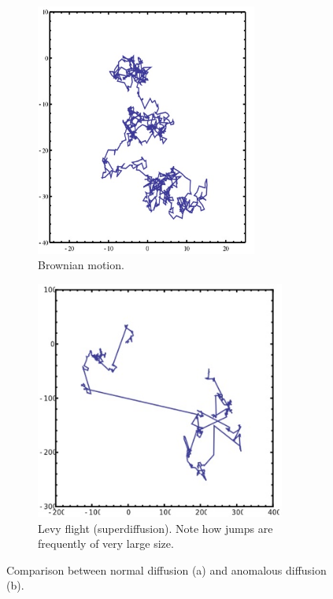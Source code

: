 \documentclass[../template.tex]{subfiles}
\begin{document}
\begin{figure}[!tbp]
    \begin{subfigure}[c]{0.45\textwidth}
      \centering
      \includegraphics[width=0.8\textwidth]{Images/brownian.jpg}
      \caption{Brownian motion.}
      \label{fig:f1}
    \end{subfigure}
    \hfill
    \begin{subfigure}[c]{0.45\textwidth}
      \centering
      \includegraphics[width=0.9\textwidth]{Images/levy.jpg}
      \caption{Levy flight (superdiffusion). Note how jumps are frequently of very large size.}
      \label{fig:f2}
    \end{subfigure}
    \caption{Comparison between normal diffusion (a) and anomalous diffusion (b).\label{fig:levy}}
  \end{figure}
    
\end{document}
